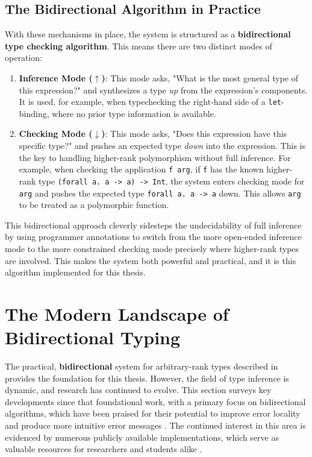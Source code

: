 \subsection{The Bidirectional Algorithm in Practice}
With these mechanisms in place, the system is structured as a \textbf{bidirectional type checking algorithm}. This means there are two distinct modes of operation:
\begin{enumerate}
    \item \textbf{Inference Mode ($\uparrow$)}: This mode asks, "What is the most general type of this expression?" and synthesizes a type \textit{up} from the expression's components. It is used, for example, when typechecking the right-hand side of a \texttt{let}-binding, where no prior type information is available.
    \item \textbf{Checking Mode ($\downarrow$)}: This mode asks, "Does this expression have this specific type?" and pushes an expected type \textit{down} into the expression. This is the key to handling higher-rank polymorphism without full inference. For example, when checking the application \texttt{f arg}, if \texttt{f} has the known higher-rank type \texttt{(forall a. a -> a) -> Int}, the system enters checking mode for \texttt{arg} and pushes the expected type \texttt{forall a. a -> a} down. This allows \texttt{arg} to be treated as a polymorphic function.
\end{enumerate}

This bidirectional approach cleverly sidesteps the undecidability of full inference by using programmer annotations to switch from the more open-ended inference mode to the more constrained checking mode precisely where higher-rank types are involved. This makes the system both powerful and practical, and it is this algorithm implemented for this thesis.
%

\section{The Modern Landscape of Bidirectional Typing}
\label{chap:LiteratureReview:sec:TypeInferenceAlgorithm}

The practical, \textbf{bidirectional} system for arbitrary-rank types described in \cite{jones-practical-2007} provides the foundation for this thesis. However, the field of type inference is dynamic, and research has continued to evolve. This section surveys key developments since that foundational work, with a primary focus on bidirectional algorithms, which have been praised for their potential to improve error locality and produce more intuitive error messages \cite{dunfield-bidirectional-2020}. The continued interest in this area is evidenced by numerous publicly available implementations, which serve as valuable resources for researchers and students alike \cite{github-goldenberg-artem-goldenbergbidirectionalsystem-2025, github-choi-kwanghoonbidi-2025, github-chen-cu1ch3ntype-inference-zoo-2025}.

